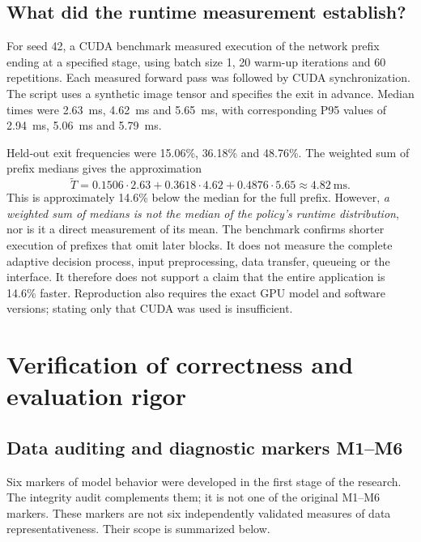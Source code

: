 \documentclass[12pt,a4paper]{article}
\begin{document}
\subsection{What did the runtime measurement establish?}

For seed 42, a CUDA benchmark measured execution of the network prefix
ending at a specified stage, using batch size 1, 20 warm-up iterations
and 60 repetitions. Each measured forward pass was followed by CUDA
synchronization. The script uses a synthetic image tensor and specifies
the exit in advance.
Median times were 2.63~ms, 4.62~ms and 5.65~ms, with corresponding
P95 values of 2.94~ms, 5.06~ms and 5.79~ms.

Held-out exit frequencies were 15.06\%, 36.18\% and 48.76\%.
The weighted sum of prefix medians gives the approximation
\begin{equation}
\widetilde{T}=0.1506\cdot2.63+0.3618\cdot4.62+
0.4876\cdot5.65\approx4.82\ \mathrm{ms}.
\end{equation}
This is approximately 14.6\% below the median for the full prefix.
However, \emph{a weighted sum of medians is not the median of the policy's
runtime distribution}, nor is it a direct measurement of its mean.
The benchmark confirms shorter execution of prefixes that omit later
blocks. It does not measure the complete adaptive decision process,
input preprocessing, data transfer, queueing or the interface.
It therefore does not support a claim that the entire application
is 14.6\% faster.
Reproduction also requires the exact GPU model and software versions;
stating only that CUDA was used is insufficient.

\section{Verification of correctness and evaluation rigor}

\subsection{Data auditing and diagnostic markers M1--M6}

Six markers of model behavior were developed in the first stage of the research.
The integrity audit complements them; it is not one of the original
M1--M6 markers. These markers are not six independently validated measures
of data representativeness. Their scope is summarized below.
\end{document}
